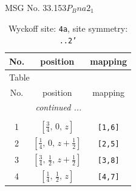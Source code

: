 \documentclass[fleqn,8pt]{jsarticle}
\begin{document}
\setcounter{MaxMatrixCols}{32}

\renewcommand{\tablename}{Table~}
\renewcommand{\figurename}{Figure~}
\begin{center}
\LARGE
MSG No. 33.153\quad$P_{B}na2_{1}$
\end{center}
\renewcommand{\arraystretch}{1.2}
\begin{longtable}{ccc}
\caption{Wyckoff site: {\tt 4a}, site symmetry: {\tt ..2'}}
 \\
 \hline \hline
No. & position & mapping \\ \hline \endfirsthead

\multicolumn{2}{l}{\tablename\ \thetable{}} \\
 \hline \hline
No. & position & mapping \\ \hline \endhead

 \hline \hline
\multicolumn{2}{r}{\footnotesize\it continued ...} \\ \endfoot

 \hline \hline
\multicolumn{2}{r}{} \\ \endlastfoot

1 & $\left[ \frac{3}{4},\, 0,\, z \right]$ & {\tt [1,6]} \\ \hline
2 & $\left[ \frac{1}{4},\, 0,\, z + \frac{1}{2} \right]$ & {\tt [2,5]} \\ \hline
3 & $\left[ \frac{3}{4},\, \frac{1}{2},\, z + \frac{1}{2} \right]$ & {\tt [3,8]} \\ \hline
4 & $\left[ \frac{1}{4},\, \frac{1}{2},\, z \right]$ & {\tt [4,7]} \\
\end{longtable}
\renewcommand{\arraystretch}{1.2}
\end{document}
